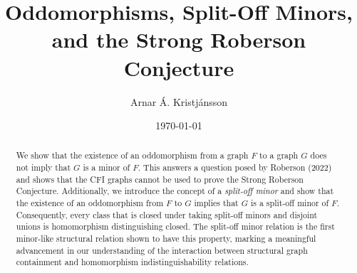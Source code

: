 \documentclass[11pt]{article}
\title{Oddomorphisms, Split-Off Minors, and the Strong Roberson Conjecture}
\author{Arnar Á. Kristjánsson}
\date{\today}
\begin{document}
\maketitle

\begin{abstract}
We show that the existence of an oddomorphism from a graph $F$ to a graph $G$ does not imply that $G$ is a minor of $F$. This answers a question posed by Roberson (2022) and shows that the CFI graphs cannot be used to prove the Strong Roberson Conjecture. 
Additionally, we introduce the concept of a \emph{split-off minor} and show that the existence of an oddomorphism from $F$ to $G$ implies that $G$ is a split-off minor of $F$. Consequently, every class that is closed under taking split-off minors and disjoint unions is homomorphism distinguishing closed. The split-off minor relation is the first minor-like structural relation shown to have this property, marking a meaningful advancement in our understanding of the interaction between structural graph containment and homomorphism indistinguishability relations.
\end{abstract}
\end{document}
